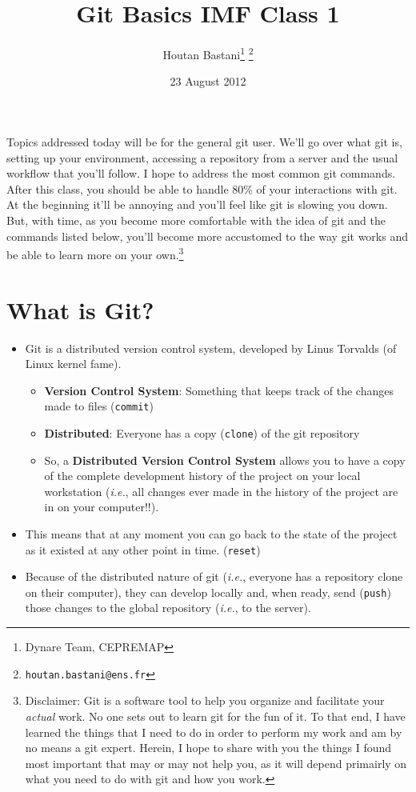 \documentclass[10pt,letterpaper]{article}
\begin{document}
\title{Git Basics IMF Class 1}
\author{Houtan Bastani\thanks{Dynare Team, CEPREMAP} \thanks{\texttt{houtan.bastani@ens.fr}}}
\date{23 August 2012}
\maketitle

Topics addressed today will be for the general git user. We'll go over what git is, setting up your environment, accessing a repository from a server and the usual workflow that you'll follow. I hope to address the most common git commands. After this class, you should be able to handle 80\% of your interactions with git. At the beginning it'll be annoying and you'll feel like git is slowing you down. But, with time, as you become more comfortable with the idea of git and the commands listed below, you'll become more accustomed to the way git works and be able to learn more on your own.\footnote{Disclaimer: Git is a software tool to help you organize and facilitate your \textit{actual} work. No one sets out to learn git for the fun of it. To that end, I have learned the things that I need to do in order to perform my work and am by no means a git expert. Herein, I hope to share with you the things I found most important that may or may not help you, as it will depend primairly on what you need to do with git and how you work.}

\section{What is Git?}
\begin{itemize}
  \item Git is a distributed version control system, developed by Linus Torvalds (of Linux kernel fame).
  \begin{itemize}
    \item \textbf{Version Control System}: Something that keeps track of the changes made to files (\texttt{commit})
    \item \textbf{Distributed}: Everyone has a copy (\texttt{clone}) of the git repository
    \item So, a \textbf{Distributed Version Control System} allows you to have a copy of the complete development history of the project on your local workstation (\textit{i.e.}, all changes ever made in the history of the project are in on your computer!!).
  \end{itemize}
  \item This means that at any moment you can go back to the state of the project as it existed at any other point in time. (\texttt{reset})
  \item Because of the distributed nature of git (\textit{i.e.}, everyone has a repository clone on their computer), they can develop locally and, when ready, send (\texttt{push}) those changes to the global repository (\textit{i.e.}, to the server).
\end{itemize}
\end{document}
